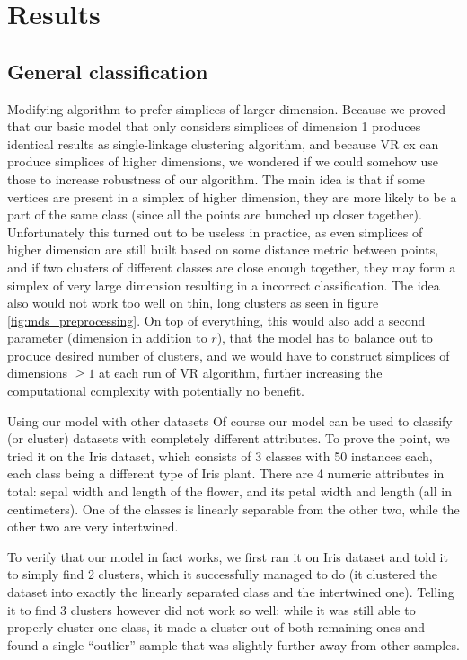 \documentclass{article}
\newcommand{\enterProblemHeader}[1]{
}
\newcommand{\exitProblemHeader}[1]{
}
\newcounter{homeworkProblemCounter} %
\newcommand{\homeworkProblemName}{}
\newenvironment{homeworkProblem}[1][Problem \arabic{homeworkProblemCounter}]{ %
\stepcounter{homeworkProblemCounter} %
\renewcommand{\homeworkProblemName}{#1} %
\section{\homeworkProblemName} %
\enterProblemHeader{\homeworkProblemName} %
}{
\exitProblemHeader{\homeworkProblemName} %
}
\newcommand{\homeworkSectionName}{}
\newenvironment{homeworkSection}[1]{ %
\renewcommand{\homeworkSectionName}{#1} %
\subsection{\homeworkSectionName} %
\enterProblemHeader{\homeworkProblemName\ [\homeworkSectionName]} %
}{
\enterProblemHeader{\homeworkProblemName} %
}
\begin{document}
\begin{homeworkProblem}[Results]
\begin{homeworkSection}{General classification}
\begin{paragraph}{Modifying algorithm to prefer simplices of larger dimension.}  
  Because we proved that our basic model that only considers simplices of dimension 1 produces identical results as single-linkage clustering algorithm, and because VR cx can produce simplices of higher dimensions, we wondered if we could somehow use those to increase robustness of our algorithm. The main idea is that if some vertices are present in a simplex of higher dimension, they are more likely to be a part of the same class (since all the points are bunched up closer together). Unfortunately this turned out to be useless in practice, as even simplices of higher dimension are still built based on some distance metric between points, and if two clusters of different classes are close enough together, they may form a simplex of very large dimension resulting in a incorrect classification. The idea also would not work too well on thin, long clusters as seen in figure \ref{fig:mds_preprocessing}. On top of everything, this would also add a second parameter (dimension in addition to $r$), that the model has to balance out to produce desired number of clusters, and we would have to construct simplices of dimensions $\ge 1$ at each run of VR algorithm, further increasing the computational complexity with potentially no benefit.
\end{paragraph}

\begin{paragraph}{Using our model with other datasets}  
  Of course our model can be used to classify (or cluster) datasets with completely different attributes. To prove the point, we tried it on the Iris dataset, which consists of 3 classes with 50 instances each, each class being a different type of Iris plant. There are 4 numeric attributes in total: sepal width and length of the flower, and its petal width and length  (all in centimeters). One of the classes is linearly separable from the other two, while the other two are very intertwined. 

  To verify that our model in fact works, we first ran it on Iris dataset and told it to simply find 2 clusters, which it successfully managed to do (it clustered the dataset into exactly the linearly separated class and the intertwined one). Telling it to find 3 clusters however did not work so well: while it was still able to properly cluster one class, it made a cluster out of both remaining ones and found a single ``outlier'' sample that was slightly further away from other samples.
\end{paragraph}

\end{homeworkSection}
\end{homeworkProblem}
\end{document}
